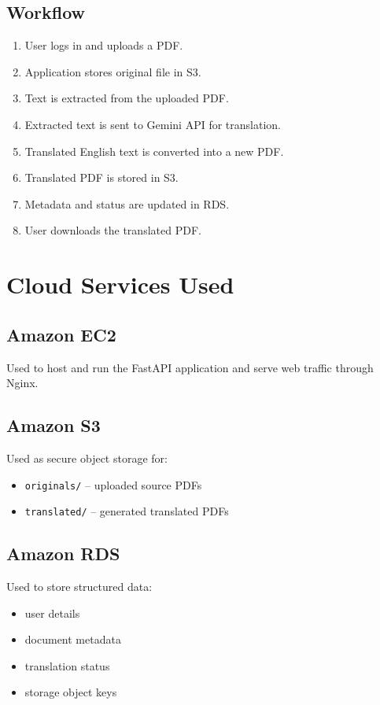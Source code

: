 \documentclass[12pt]{article}
\begin{document}
\subsection*{Workflow}
\begin{enumerate}[leftmargin=*]
    \item User logs in and uploads a PDF.
    \item Application stores original file in S3.
    \item Text is extracted from the uploaded PDF.
    \item Extracted text is sent to Gemini API for translation.
    \item Translated English text is converted into a new PDF.
    \item Translated PDF is stored in S3.
    \item Metadata and status are updated in RDS.
    \item User downloads the translated PDF.
\end{enumerate}

\section{Cloud Services Used}
\subsection*{Amazon EC2}
Used to host and run the FastAPI application and serve web traffic through Nginx.

\subsection*{Amazon S3}
Used as secure object storage for:
\begin{itemize}[leftmargin=*]
    \item \texttt{originals/} -- uploaded source PDFs
    \item \texttt{translated/} -- generated translated PDFs
\end{itemize}

\subsection*{Amazon RDS}
Used to store structured data:
\begin{itemize}[leftmargin=*]
    \item user details
    \item document metadata
    \item translation status
    \item storage object keys
\end{itemize}
\end{document}
